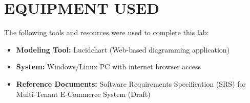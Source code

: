 \chapter{EQUIPMENT USED}
\label{ch:eqp_used}
The following tools and resources were used to complete this lab:
\begin{itemize}
    \item \textbf{Modeling Tool:} Lucidchart (Web-based diagramming application)
    \item \textbf{System:} Windows/Linux PC with internet browser access
    \item \textbf{Reference Documents:} Software Requirements Specification (SRS) for Multi-Tenant E-Commerce System (Draft)
\end{itemize}
\clearpage




